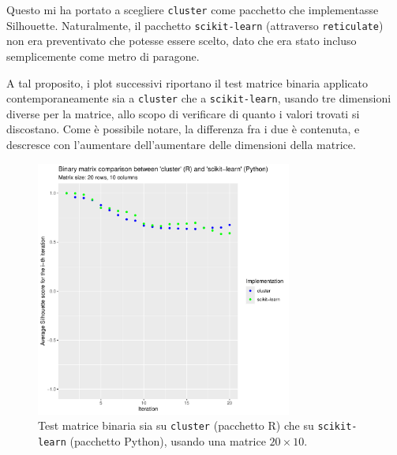 \documentclass[a4paper, 12pt]{report}
\begin{document}
			Questo mi ha portato a scegliere \texttt{cluster} come
			pacchetto che implementasse Silhouette. Naturalmente, il
			pacchetto \texttt{scikit-learn} (attraverso \texttt{reticulate})
			non era preventivato che potesse essere scelto, dato che era
			stato incluso semplicemente come metro di paragone.

			A tal proposito, i plot successivi riportano il test matrice
			binaria applicato contemporaneamente sia a \texttt{cluster}
			che a \texttt{scikit-learn}, usando tre dimensioni diverse per
			la matrice, allo scopo di verificare di quanto i valori trovati
			si discostano. Come è possibile notare, la differenza fra i due
			è contenuta, e descresce con l'aumentare dell'aumentare delle
			dimensioni della matrice.

			\begin{figure}[H]
				\centering
				\includegraphics[width = 0.75\textwidth, page = 1]{results/Final_comparison.pdf}
				\caption{Test matrice binaria sia su \texttt{cluster} (pacchetto R) che su
				\texttt{scikit-learn} (pacchetto Python), usando una matrice $20 \times 10$.}
				\label{fig:cmp1}
			\end{figure}
\end{document}
